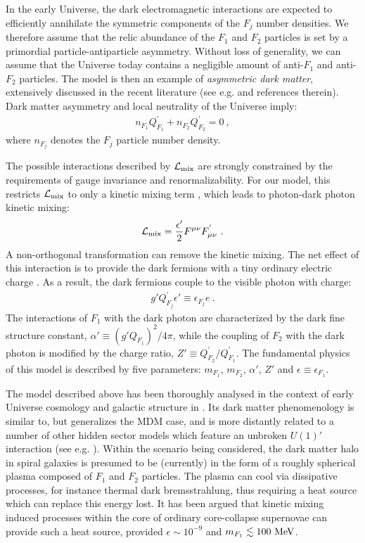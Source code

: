 \documentclass[12pt]{article}
\begin{document}
In the early Universe, the dark electromagnetic interactions are expected to efficiently annihilate the symmetric components of the $F_j$ number densities. We therefore assume that the relic abundance of the $F_1$ and $F_2$ particles is set by a primordial particle-antiparticle asymmetry. Without loss of generality, we can assume that the Universe today contains a negligible amount of anti-$F_1$ and anti-$F_2$ particles. The model is then an example of \textit{asymmetric dark matter}, extensively discussed in the recent literature (see e.g. \cite{asymmetric} and references therein). Dark matter asymmetry and local neutrality of the Universe imply:
%
\begin{eqnarray}
n _{F_1}Q ^{'} _{F_1} + n _{F_2}Q ^{'} _{F_2} = 0 \ ,
\label{asymmetry}
\end{eqnarray}
%
where $n _{F_j}$ denotes the $F_j$ particle number density.

The possible interactions described by ${\cal L} _{\text{mix}}$ are strongly constrained by the requirements of gauge invariance and renormalizability. For our model, this restricts ${\cal L} _{\text{mix}}$ to only a kinetic mixing term \cite{foothe}, which leads to photon-dark photon kinetic mixing:
%
\begin{eqnarray}
{\cal L} _{\text{mix}} = \frac{\epsilon '}{2}F ^{\mu \nu}F ^{'} _{\mu \nu} \ .
\end{eqnarray}
%
A non-orthogonal transformation can remove the kinetic mixing. The net effect of this interaction is to provide the dark fermions with a tiny ordinary electric charge \cite{holdom}. As a result, the dark fermions couple to the visible photon with charge:
%
\begin{eqnarray}
g'Q ^{'} _{F_j}\epsilon ' \equiv \epsilon _{F_j}e \ .
\end{eqnarray}
%
The interactions of $F_1$ with the dark photon are characterized by the dark fine structure constant, $\alpha ' \equiv (g'Q _{F_1})^2/4\pi$, while the coupling of $F_2$ with the dark photon is modified by the charge ratio, $Z' \equiv Q ^{'} _{F_2}/Q ^{'} _{F_1}$. The fundamental physics of this model is described by five parameters: $m _{F_1}$, $m _{F_2}$, $\alpha '$, $Z'$ and $\epsilon \equiv \epsilon _{F_1}$.

The model described above has been thoroughly analysed in the context of early Universe cosmology and galactic structure in \cite{dhsdm}. Its dark matter phenomenology is similar to, but generalizes the MDM case, and is more distantly related to a number of other hidden sector models which feature an unbroken $U(1)'$ interaction (see e.g. \cite{unbroken}). Within the scenario being considered, the dark matter halo in spiral galaxies is presumed to be (currently) in the form of a roughly spherical plasma composed of $F_1$ and $F_2$ particles. The plasma can cool via dissipative processes, for instance thermal dark bremsstrahlung, thus requiring a heat source which can replace this energy lost. It has been argued that kinetic mixing induced processes within the core of ordinary core-collapse supernovae can provide such a heat source, provided $\epsilon \sim 10 ^{-9}$ and $m _{F_1} \lesssim 100 \ {\rm MeV}$.
\end{document}
